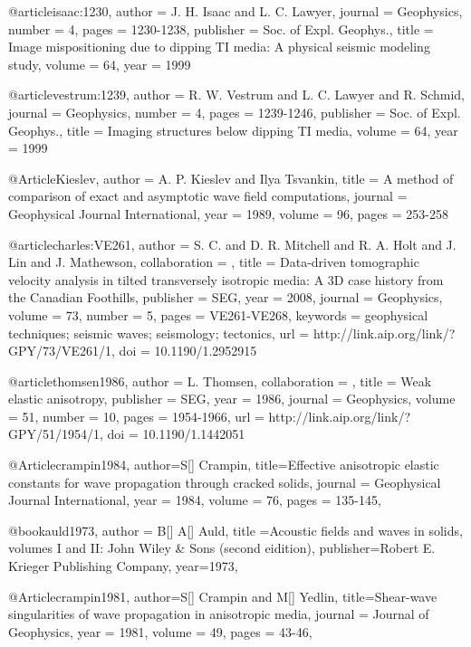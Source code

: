 @article{isaac:1230,
  author =	 {J. H. Isaac and L. C. Lawyer},
  journal =	 {Geophysics},
  number =	 4,
  pages =	 {1230-1238},
  publisher =	 {Soc. of Expl. Geophys.},
  title =	 {Image mispositioning due to dipping {TI} media: {A}
                  physical seismic modeling study},
  volume =	 64,
  year =	 1999
}

@article{vestrum:1239,
  author =	 {R. W. Vestrum and L. C. Lawyer and R. Schmid},
  journal =	 {Geophysics},
  number =	 4,
  pages =	 {1239-1246},
  publisher =	 {Soc. of Expl. Geophys.},
  title =	 {Imaging structures below dipping {TI} media},
  volume =	 64,
  year =	 1999
}

@Article{Kieslev,
  author =	 {A. P. Kieslev and Ilya Tsvankin},
  title =	 {A method of comparison of exact and asymptotic wave
                  field computations},
  journal =	 {Geophysical Journal International},
  year =	 1989,
  volume =	 96,
  pages =	 {253-258}
}

@article{charles:VE261,
author = {S. C. and D. R. Mitchell and R. A. Holt and
                  J. Lin and J. Mathewson},
collaboration = {},
title = {Data-driven tomographic velocity analysis in tilted
                  transversely isotropic media: A 3{D} case history from
                  the Canadian Foothills},
publisher = {SEG},
year = {2008},
journal = {Geophysics},
volume = {73},
number = {5},
pages = {VE261-VE268},
keywords = {geophysical techniques; seismic waves; seismology; tectonics},
url = {http://link.aip.org/link/?GPY/73/VE261/1},
doi = {10.1190/1.2952915}
}


@article{thomsen1986,
author = {L. Thomsen},
collaboration = {},
title = {Weak elastic anisotropy},
publisher = {SEG},
year = {1986},
journal = {Geophysics},
volume = {51},
number = {10},
pages = {1954-1966},
url = {http://link.aip.org/link/?GPY/51/1954/1},
doi = {10.1190/1.1442051}
}

@Article{crampin1984,
  author={S[] Crampin},
  title={Effective anisotropic elastic constants for wave propagation through cracked solids},
  journal = 	 {Geophysical Journal International},
  year = 	 1984,
  volume =	 76,
  pages =	 {135-145},
}

@book{auld1973,
  author = {B[] A[] Auld},
  title ={Acoustic fields and waves in solids, volumes I and II: John Wiley \& Sons (second eidition)},
  publisher={Robert E. Krieger Publishing
Company},
  year=1973,
}

@Article{crampin1981,
  author={S[] Crampin and M[] Yedlin},
  title={Shear-wave singularities of wave propagation
in anisotropic media},
  journal = 	 {Journal of Geophysics},
  year = 	 1981,
  volume =	49,
  pages =	 {43-46},
}

